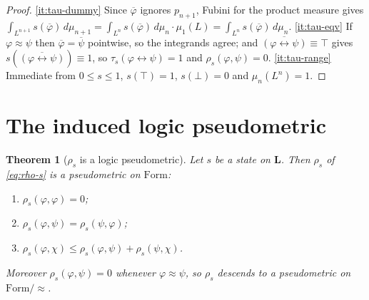 \documentclass{amsart}
\theoremstyle{definition}
\theoremstyle{plain}
\newtheorem{theorem}{Theorem}
\newcommand{\bL}{\mathbf{L}}
\newcommand{\Form}{\mathrm{Form}}
\newcommand{\fbi}{\leftrightarrow}
\newcommand{\Top}{\top}
\newcommand{\Bot}{\bot}
\begin{document}
\begin{proof}
\eqref{it:tau-dummy} Since $\overline\varphi$ ignores $p_{n+1}$, Fubini for the
product measure gives
$\int_{L^{n+1}}s(\overline\varphi)\,d\mu_{n+1}
=\int_{L^n}s(\overline\varphi)\,d\mu_n\cdot\mu_1(L)
=\int_{L^n}s(\overline\varphi)\,d\mu_n$.
\eqref{it:tau-eqv} If $\varphi\approx\psi$ then $\overline\varphi=\overline\psi$
pointwise, so the integrands agree; and $\overline{(\varphi\fbi\psi)}\equiv\Top$
gives $s(\overline{(\varphi\fbi\psi)})\equiv1$, so
$\tau_s(\varphi\fbi\psi)=1$ and $\rho_s(\varphi,\psi)=0$.
\eqref{it:tau-range} Immediate from $0\le s\le1$, $s(\Top)=1$, $s(\Bot)=0$ and
$\mu_n(L^n)=1$.
\end{proof}

\section{The induced logic pseudometric}\label{sec:metric}

\begin{theorem}[$\rho_s$ is a logic pseudometric]\label{thm:pseudometric}
Let $s$ be a state on $\bL$.  Then $\rho_s$ of \eqref{eq:rho-s} is a pseudometric
on $\Form$:
\begin{enumerate}
\item\label{it:rho-zero} $\rho_s(\varphi,\varphi)=0$;
\item\label{it:rho-sym} $\rho_s(\varphi,\psi)=\rho_s(\psi,\varphi)$;
\item\label{it:rho-tri} $\rho_s(\varphi,\chi)\le\rho_s(\varphi,\psi)+\rho_s(\psi,\chi)$.
\end{enumerate}
Moreover $\rho_s(\varphi,\psi)=0$ whenever $\varphi\approx\psi$, so $\rho_s$
descends to a pseudometric on $\Form/{\approx}$.
\end{theorem}
\end{document}
